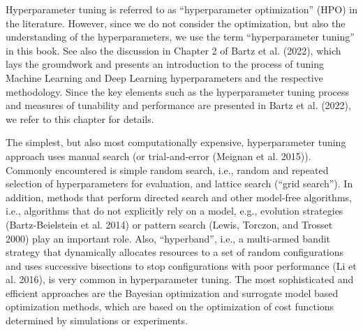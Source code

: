\documentclass[
  letterpaper,
  DIV=11,
  numbers=noendperiod]{scrreprt}
\begin{document}
Hyperparameter tuning is referred to as ``hyperparameter optimization''
(HPO) in the literature. However, since we do not consider the
optimization, but also the understanding of the hyperparameters, we use
the term ``hyperparameter tuning'' in this book. See also the discussion
in Chapter 2 of Bartz et al. (2022), which lays the groundwork and
presents an introduction to the process of tuning Machine Learning and
Deep Learning hyperparameters and the respective methodology. Since the
key elements such as the hyperparameter tuning process and measures of
tunability and performance are presented in Bartz et al. (2022), we
refer to this chapter for details.

The simplest, but also most computationally expensive, hyperparameter
tuning approach uses manual search (or trial-and-error (Meignan et al.
2015)). Commonly encountered is simple random search, i.e., random and
repeated selection of hyperparameters for evaluation, and lattice search
(``grid search''). In addition, methods that perform directed search and
other model-free algorithms, i.e., algorithms that do not explicitly
rely on a model, e.g., evolution strategies (Bartz-Beielstein et al.
2014) or pattern search (Lewis, Torczon, and Trosset 2000) play an
important role. Also, ``hyperband'', i.e., a multi-armed bandit strategy
that dynamically allocates resources to a set of random configurations
and uses successive bisections to stop configurations with poor
performance (Li et al. 2016), is very common in hyperparameter tuning.
The most sophisticated and efficient approaches are the Bayesian
optimization and surrogate model based optimization methods, which are
based on the optimization of cost functions determined by simulations or
experiments.
\end{document}
